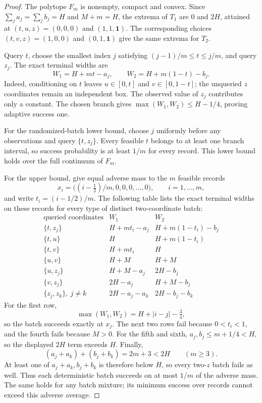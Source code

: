 \documentclass[12pt]{article}
\begin{document}
\begin{proof}
The polytope $F_m$ is nonempty, compact and convex. Since
$\sum_j a_j=\sum_j b_j=H$ and $M+m=H$, the extrema of $T_1$ are
$0$ and $2H$, attained at $(t,u,z)=(0,0,0)$ and $(1,1,\boldsymbol1)$.
The corresponding choices $(t,v,z)=(1,0,0)$ and
$(0,1,\boldsymbol1)$ give the same extrema for $T_2$.

Query $t$, choose the smallest index $j$ satisfying
$(j-1)/m\leq t\leq j/m$, and query $z_j$. The exact terminal widths are
\begin{equation}
 W_1=H+mt-a_j,\qquad W_2=H+m(1-t)-b_j.
 \label{eq:two-target-boundary-widths}
\end{equation}
Indeed, conditioning on $t$ leaves $u\in[0,t]$ and $v\in[0,1-t]$;
the unqueried $z$ coordinates remain an independent box. The observed
value of $z_j$ contributes only a constant. The chosen branch gives
$\max(W_1,W_2)\leq H-1/4$, proving adaptive success one.

For the randomized-batch lower bound, choose $j$ uniformly before any
observations and query $\{t,z_j\}$. Every feasible $t$ belongs to at least
one branch interval, so success probability is at least $1/m$ for every
record. This lower bound holds over the full continuum of $F_m$.

For the upper bound, give equal adverse mass to the $m$ feasible records
\[
 x_i=\bigl((i-\tfrac12)/m,0,0,0,\ldots,0\bigr),
       \qquad i=1,\ldots,m,
\]
and write $t_i=(i-1/2)/m$. The following table lists the exact terminal
widths on these records for every type of distinct two-coordinate batch:
\[
\begin{array}{c|cc}
\text{queried coordinates}&W_1&W_2\\\hline
\{t,z_j\}&H+mt_i-a_j&H+m(1-t_i)-b_j\\
\{t,u\}&H&H+m(1-t_i)\\
\{t,v\}&H+mt_i&H\\
\{u,v\}&H+M&H+M\\
\{u,z_j\}&H+M-a_j&2H-b_j\\
\{v,z_j\}&2H-a_j&H+M-b_j\\
\{z_j,z_k\},\ j\ne k&2H-a_j-a_k&2H-b_j-b_k
\end{array}
\]
For the first row,
\[
 \max(W_1,W_2)=H+|i-j|-\tfrac34,
\]
so the batch succeeds exactly at $x_j$. The next two rows fail because
$0<t_i<1$, and the fourth fails because $M>0$. For the fifth and sixth,
$a_j,b_j\leq m+1/4<H$, so the displayed $2H$ term exceeds $H$.
Finally,
\[
 (a_j+a_k)+(b_j+b_k)=2m+3<2H \qquad(m\geq3).
\]
At least one of $a_j+a_k,b_j+b_k$ is therefore below $H$, so every
two-$z$ batch fails as well. Thus each deterministic batch succeeds on
at most $1/m$ of the adverse mass. The same holds for any batch mixture;
its minimum success over records cannot exceed this adverse average.


\end{proof}
\end{document}
